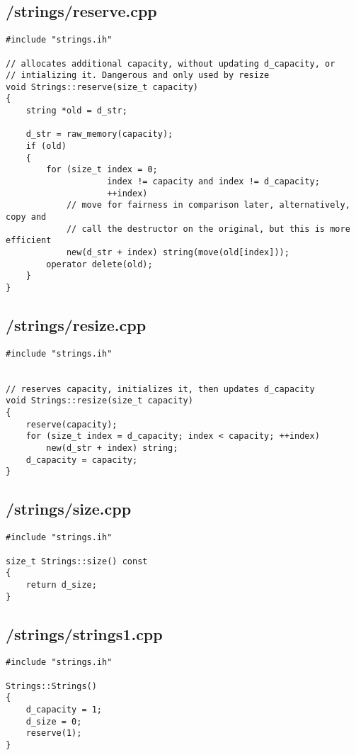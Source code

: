 \documentclass{article}
\begin{document}
\subsection*{/strings/reserve.cpp}
\begin{verbatim}
#include "strings.ih"

// allocates additional capacity, without updating d_capacity, or
// intializing it. Dangerous and only used by resize
void Strings::reserve(size_t capacity)
{
    string *old = d_str;

    d_str = raw_memory(capacity);
    if (old)
    {
        for (size_t index = 0; 
                    index != capacity and index != d_capacity; 
                    ++index)
            // move for fairness in comparison later, alternatively, copy and 
            // call the destructor on the original, but this is more efficient
            new(d_str + index) string(move(old[index]));
        operator delete(old);
    }
}

\end{verbatim}
\subsection*{/strings/resize.cpp}
\begin{verbatim}
#include "strings.ih"


// reserves capacity, initializes it, then updates d_capacity
void Strings::resize(size_t capacity)
{
    reserve(capacity);
    for (size_t index = d_capacity; index < capacity; ++index)
        new(d_str + index) string;
    d_capacity = capacity;  
}
\end{verbatim}
\subsection*{/strings/size.cpp}
\begin{verbatim}
#include "strings.ih"

size_t Strings::size() const
{
    return d_size;   
}
\end{verbatim}
\subsection*{/strings/strings1.cpp}
\begin{verbatim}
#include "strings.ih"

Strings::Strings()
{
    d_capacity = 1;
    d_size = 0;
    reserve(1);
}

\end{verbatim}
\end{document}
